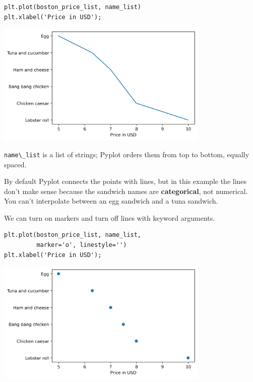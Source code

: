\begin{lstlisting}[]
plt.plot(boston_price_list, name_list)
plt.xlabel('Price in USD');
\end{lstlisting}

\begin{center}
\includegraphics[width=4in]{chapters/06_plotting_files/06_plotting_39_0.png}
\end{center}

\passthrough{\lstinline!name\_list!} is a list of strings; Pyplot orders
them from top to bottom, equally spaced.

By default Pyplot connects the points with lines, but in this example
the lines don't make sense because the sandwich names are
\textbf{categorical}, not numerical. You can't interpolate between an
egg sandwich and a tuna sandwich.

We can turn on markers and turn off lines with keyword arguments.

\begin{lstlisting}[]
plt.plot(boston_price_list, name_list, 
         marker='o', linestyle='')
plt.xlabel('Price in USD');
\end{lstlisting}

\begin{center}
\includegraphics[width=4in]{chapters/06_plotting_files/06_plotting_41_0.png}
\end{center}

